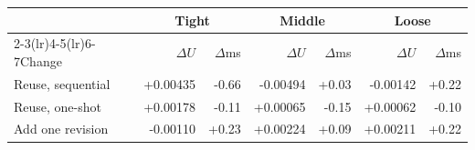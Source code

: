 \begin{tabular}{lrrrrrr}
\toprule
 & \multicolumn{2}{c}{Tight} & \multicolumn{2}{c}{Middle} & \multicolumn{2}{c}{Loose}\\ \cmidrule(lr){2-3}\cmidrule(lr){4-5}\cmidrule(lr){6-7}Change & $\Delta U$ & $\Delta$ms & $\Delta U$ & $\Delta$ms & $\Delta U$ & $\Delta$ms \\
\midrule
Reuse, sequential & +0.00435 & -0.66 & -0.00494 & +0.03 & -0.00142 & +0.22 \\
Reuse, one-shot & +0.00178 & -0.11 & +0.00065 & -0.15 & +0.00062 & -0.10 \\
Add one revision & -0.00110 & +0.23 & +0.00224 & +0.09 & +0.00211 & +0.22 \\
\bottomrule
\end{tabular}
